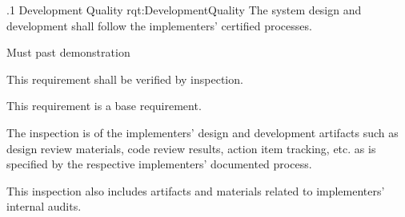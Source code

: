\ONERQMT
{\RqtNumberBase.1}
{Development Quality}
{rqt:DevelopmentQuality}
{The system design and development shall follow the implementers' certified processes.}
{
	\item [Phase 1] Must past demonstration
}
{This requirement shall be verified by inspection.}
{
	\item [N/A] This requirement is a base requirement.
}
{
	\item The inspection is of the implementers' design and development artifacts such as design review materials, code review results, action item tracking, etc. as is specified by the respective implementers' documented process.
	\item This inspection also includes artifacts and materials related to implementers' internal audits.
}
